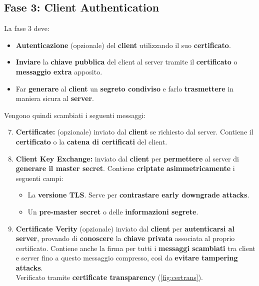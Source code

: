 \subsection{Fase 3: Client Authentication}
La fase 3 deve:
\begin{proposition}[Phase 3]\label{prop:phase3}
\begin{itemize}
    \item \textbf{Autenticazione} (opzionale) del \textbf{client} utilizzando il suo \textbf{certificato}.
    \item \textbf{Inviare} la \textbf{chiave pubblica} del client al server tramite il \textbf{certificato} o \textbf{messaggio extra} apposito.
    \item Far \textbf{generare} al \textbf{client} un \textbf{segreto condiviso} e farlo \textbf{trasmettere} in maniera sicura al \textbf{server}.
\end{itemize}
\end{proposition}
Vengono quindi scambiati i seguenti messaggi:
\begin{definition}
\begin{enumerate}\setcounter{enumi}{6}
    \item \textbf{Certificate:} (opzionale) inviato dal \textbf{client} se richiesto dal server. Contiene il \textbf{certificato} o la \textbf{catena di certificati} del client.
    \item \textbf{Client Key Exchange:} inviato dal \textbf{client} per \textbf{permettere} al server di\textbf{ generare il master secret}. Contiene \textbf{criptate} \textbf{asimmetricamente} i seguenti campi:
    \begin{itemize}
        \item La \textbf{versione TLS}. Serve per \textbf{contrastare early downgrade attacks}.
        \item Un \textbf{pre-master secret} o delle \textbf{informazioni segrete}.
    \end{itemize}
    \item \textbf{Certificate Verity} (opzionale) inviato dal \textbf{client} per \textbf{autenticarsi al server}, provando di \textbf{conoscere} la \textbf{chiave privata} associata al proprio certificato. Contiene anche la firma per tutti i \textbf{messaggi scambiati} tra client e server fino a questo messaggio compresso, così da \textbf{evitare tampering attacks}.\\
    Verificato tramite \textbf{certificate transparency} (\cref{fig:certrans}).
\end{enumerate}
\end{definition}
